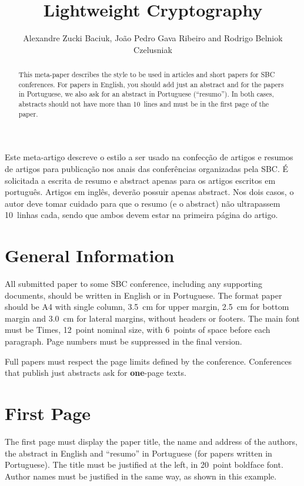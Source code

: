 \documentclass{SBCbookchapter}
\author{Alexandre Zucki Baciuk, João Pedro Gava Ribeiro and Rodrigo Belniok Czelusniak}
\title{Lightweight Cryptography}
\begin{document}
\maketitle

\begin{abstract}
This meta-paper describes the style to be used in articles and short
papers for SBC conferences. For papers in English, you should add just
an abstract and for the papers in Portuguese, we also ask for an
abstract in Portuguese (``resumo''). In both cases, abstracts should not
have more than 10~lines and must be in the first page of the paper.
\end{abstract}

\begin{resumo}
\begin{otherlanguage}{brazil}
Este meta-artigo descreve o estilo a ser usado na confecção de artigos
e resumos de artigos para publicação nos anais das conferências
organizadas pela SBC. É solicitada a escrita de resumo e abstract apenas
para os artigos escritos em português. Artigos em inglês, deverão
possuir apenas abstract. Nos dois casos, o autor deve tomar cuidado para
que o resumo (e o abstract) não ultrapassem 10~linhas cada, sendo que
ambos devem estar na primeira página do artigo.
\end{otherlanguage}
\end{resumo}

\section{General Information}
All submitted paper to some SBC conference, including any supporting
documents, should be written in English or in Portuguese. The format
paper should be A4 with single column, 3.5~cm for upper margin, 2.5~cm
for bottom margin and 3.0~cm for lateral margins, without headers or
footers. The main font must be Times, 12~point nominal size, with
6~points of space before each paragraph. Page numbers must be
suppressed in the final version.

Full papers must respect the page limits defined by the conference.
Conferences that publish just abstracts ask for \textbf{one}-page
texts.

\section{First Page}
The first page must display the paper title, the name and address of
the authors, the abstract in English and ``resumo'' in Portuguese (for
papers written in Portuguese). The title must be justified at the
left, in 20~point boldface font. Author names must be justified in the
same way, as shown in this example.
\end{document}
